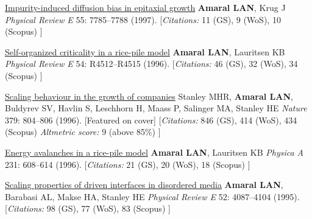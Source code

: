 \NumberedItem{\makebox[0.8cm][r]{[11]}}
\href{/people/amaral/impurity-induced-diffusion-bias-in-epitaxial-growth}
{Impurity-induced diffusion bias in epitaxial growth}
\newline
{\textbf{Amaral LAN}}, Krug J
\newline
\textit{Physical Review E}
    55:
7785--7788 (1997).
    \newline
    \hfill [{\em{Citations:}} 11 (GS),
    9 (WoS), 10 (Scopus)
    ]
\newline
\Gap
~
\Gap

\NumberedItem{\makebox[0.8cm][r]{[10]}}
\href{/people/amaral/self-organized-critically-in-a-rice-pile-model}
{Self-organized criticality in a rice-pile model}
\newline
{\textbf{Amaral LAN}}, Lauritsen KB
\newline
\textit{Physical Review E}
    54:
R4512--R4515 (1996).
    \newline
    \hfill [{\em{Citations:}} 46 (GS),
    32 (WoS), 34 (Scopus)
    ]
\newline
\Gap
~
\Gap

\NumberedItem{\makebox[0.8cm][r]{[9]}}
\href{/people/amaral/scaling-behaviour-in-the-growth-of-companies}
{Scaling behaviour in the growth of companies}
\newline
Stanley MHR, {\textbf{Amaral LAN}}, Buldyrev SV, Havlin S, Leschhorn H, Maass P, Salinger MA, Stanley HE
\newline
\textit{Nature}
    379:
804--806 (1996).
    [Featured on cover]
    \newline
    \hfill [{\em{Citations:}} 846 (GS),
    414 (WoS), 434 (Scopus)
        {\hspace*{1cm} \em{Altmetric score:}}  9 (above 85\%)
    ]
\newline
\Gap
~
\Gap

\NumberedItem{\makebox[0.8cm][r]{[8]}}
\href{/people/amaral/energy-avalanches-in-a-rice-pile-model}
{Energy avalanches in a rice-pile model}
\newline
{\textbf{Amaral LAN}}, Lauritsen KB
\newline
\textit{Physica A}
    231:
608--614 (1996).
    \newline
    \hfill [{\em{Citations:}} 21 (GS),
    20 (WoS), 18 (Scopus)
    ]
\newline
\Gap
~
\Gap

\NumberedItem{\makebox[0.8cm][r]{[7]}}
\href{/people/amaral/scaling-properties-of-driven-interfaces-in-disordered-media}
{Scaling properties of driven interfaces in disordered media}
\newline
{\textbf{Amaral LAN}}, Barabasi AL, Makse HA, Stanley HE
\newline
\textit{Physical Review E}
    52:
4087--4104 (1995).
    \newline
    \hfill [{\em{Citations:}} 98 (GS),
    77 (WoS), 83 (Scopus)
    ]
\newline
\Gap
~
\Gap

